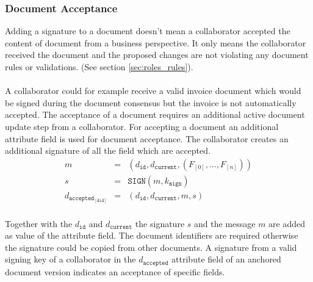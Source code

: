 \subsubsection{Document Acceptance}
Adding a signature to a document doesn't mean a collaborator accepted the content of document from a business perspective. It only means the collaborator received the document and the proposed changes are not violating any document rules or validations. (See section \ref{sec:roles_rules}).\\\\ A collaborator could for example receive a valid invoice document which would be signed during the document consensus but the invoice is not automatically accepted. The acceptance of a document requires an additional active document update step from a collaborator.  For accepting a document an additional attribute field is used for document acceptance. The collaborator creates an additional signature of all the field which are accepted.\\
\begin{eqnarray}
m  & = & (d_{\mathtt{id}},d_{\mathtt{current}},(F_{[0]},...,F_{[n]}))\\
s & = &  \mathtt{SIGN}(m,k_{\mathtt{sign}}) \\
d_{\mathtt{accepted_{[did]}}} & = & (d_{\mathtt{id}},d_{\mathtt{current}},m,s)
\end{eqnarray}\\
Together with the $d_{\mathtt{id}}$ and $d_{\mathtt{current}}$ the signature $s$ and the message $m$ are added as value of the attribute field. The document identifiers are required otherwise the signature could be copied from other documents. A signature from a valid signing key of a collaborator in the $d_{\mathtt{accepted}}$ attribute field of an anchored document version indicates an acceptance of specific fields.


